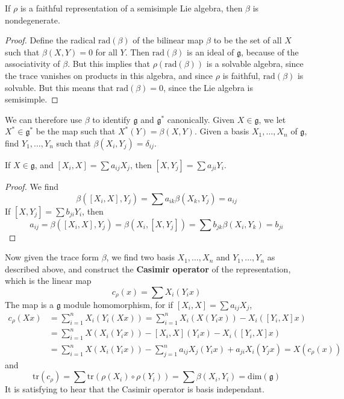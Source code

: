 \begin{lemma}
    If $\rho$ is a faithful representation of a semisimple Lie algebra, then $\beta$ is nondegenerate.
\end{lemma}
\begin{proof}
    Define the radical $\text{rad}(\beta)$ of the bilinear map $\beta$ to be the set of all $X$ such that $\beta(X,Y) = 0$ for all $Y$. Then $\text{rad}(\beta)$ is an ideal of $\mathfrak{g}$, because of the associativity of $\beta$. But this implies that $\rho(\text{rad}(\beta))$ is a solvable algebra, since the trace vanishes on products in this algebra, and since $\rho$ is faithful, $\text{rad}(\beta)$ is solvable. But this means that $\text{rad}(\beta) = 0$, since the Lie algebra is semisimple.
\end{proof}

We can therefore use $\beta$ to identify $\mathfrak{g}$ and $\mathfrak{g}^*$ canonically. Given $X \in \mathfrak{g}$, we let $X^* \in \mathfrak{g}^*$ be the map such that $X^*(Y) = \beta(X,Y)$. Given a basis $X_1, \dots, X_n$ of $\mathfrak{g}$, find $Y_1, \dots, Y_n$ such that $\beta(X_i,Y_j) = \delta_{ij}$.

\begin{lemma}
    If $X \in \mathfrak{g}$, and $[X_i,X] = \sum a_{ij} X_j$, then $[X,Y_j] = \sum a_{ji} Y_i$.
\end{lemma}
\begin{proof}
    We find
    \[ \beta([X_i, X], Y_j) = \sum a_{ik} \beta(X_k,Y_j) = a_{ij} \]
    If $[X,Y_j] = \sum b_{ji} Y_i$, then
    \[ a_{ij} = \beta([X_i,X],Y_j) = \beta(X_i,[X,Y_j]) = \sum b_{jk} \beta(X_i, Y_k) = b_{ji} \]
\end{proof}

Now given the trace form $\beta$, we find two basis $X_1, \dots, X_n$ and $Y_1, \dots, Y_n$ as described above, and construct the {\bf Casimir operator} of the representation, which is the linear map
%
\[ c_\rho(x) = \sum X_i(Y_i x) \]
%
The map is a $\mathfrak{g}$ module homomorphism, for if $[X_i,X] = \sum a_{ij} X_j$,
%
\begin{align*}
    c_\rho(Xx) &= \sum_{i = 1}^n X_i(Y_i(Xx)) = \sum_{i = 1}^n X_i(X(Y_ix)) - X_i([Y_i,X] x)\\
    &= \sum_{i = 1}^n X(X_i(Y_ix)) - [X_i,X](Y_ix) - X_i([Y_i,X] x)\\
    &= \sum_{i = 1}^n X(X_i(Y_ix)) - \sum_{j = 1}^n a_{ij} X_j(Y_ix) + a_{ji} X_i(Y_j x) = X(c_\rho(x))
\end{align*}
%
and
%
\[ \text{tr}(c_\rho) = \sum \text{tr}(\rho(X_i) \circ \rho(Y_i)) = \sum \beta(X_i,Y_i) = \text{dim}(\mathfrak{g}) \]
%
It is satisfying to hear that the Casimir operator is basis independant.

